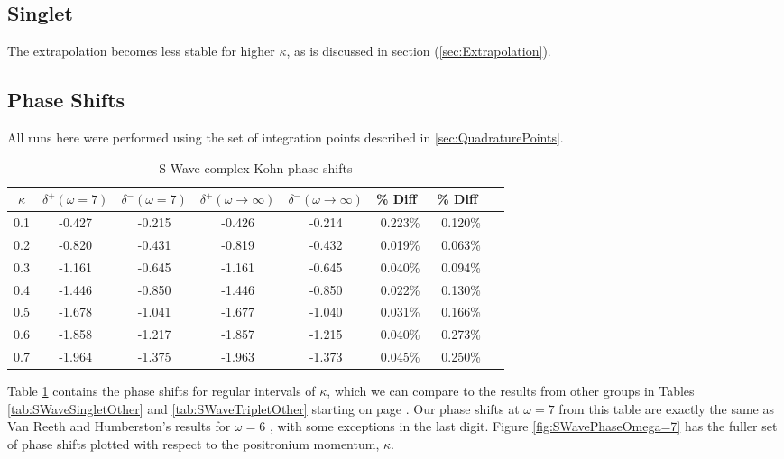 \documentclass[Dissertation.tex]{subfiles}
\begin{document}
\subsection{Singlet}
The extrapolation becomes less stable for higher $\kappa$, as is discussed in section (\ref{sec:Extrapolation}).


\subsection{Phase Shifts}

All runs here were performed using the set of integration points described in \cref{sec:QuadraturePoints}.

\begin{table}[H]
\centering
\begin{tabular}{c c c c c c c c}
\toprule
$\kappa$ & $\delta^+ (\omega = 7)$ & $\delta^- (\omega = 7)$ & $\delta^+ (\omega \rightarrow \infty)$ & $\delta^- (\omega \rightarrow \infty)$ & \% Diff$^+$ & \% Diff$^-$ \\
\midrule
0.1 & -0.427 & -0.215 & -0.426 & -0.214 & 0.223\% & 0.120\% \\
0.2 & -0.820 & -0.431 & -0.819 & -0.432 & 0.019\% & 0.063\% \\
0.3 & -1.161 & -0.645 & -1.161 & -0.645 & 0.040\% & 0.094\% \\
0.4 & -1.446 & -0.850 & -1.446 & -0.850 & 0.022\% & 0.130\% \\
0.5 & -1.678 & -1.041 & -1.677 & -1.040 & 0.031\% & 0.166\% \\
0.6 & -1.858 & -1.217 & -1.857 & -1.215 & 0.040\% & 0.273\% \\
0.7 & -1.964 & -1.375 & -1.963 & -1.373 & 0.045\% & 0.250\% \\
\bottomrule
\end{tabular}
\caption{S-Wave complex Kohn phase shifts}
\label{tab:SWavePhase}
\end{table}

Table \ref{tab:SWavePhase} contains the phase shifts for regular intervals of $\kappa$, which we can compare to the results from other groups in Tables \ref{tab:SWaveSingletOther} and \ref{tab:SWaveTripletOther} starting on page \pageref{tab:SWaveSingletOther}.  Our phase shifts at $\omega = 7$ from this table are exactly the same as Van Reeth and Humberston's results for $\omega = 6$ \cite{VanReeth2003}, with some exceptions in the last digit.  Figure \ref{fig:SWavePhaseOmega=7} has the fuller set of phase shifts plotted with respect to the positronium momentum, $\kappa$.
\end{document}
